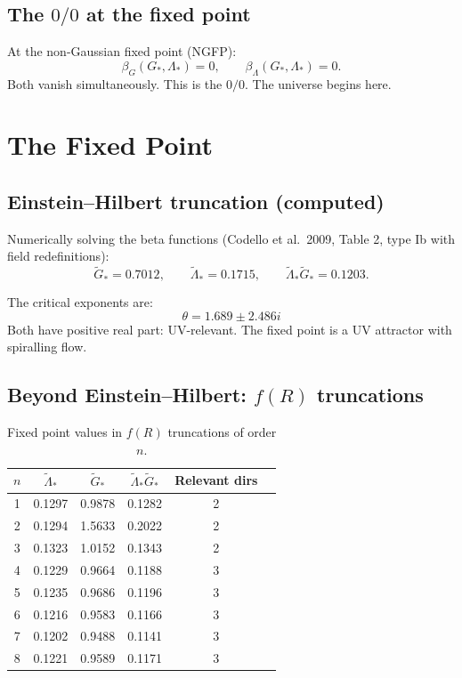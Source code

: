 \documentclass[12pt]{article}
\begin{document}
\subsection{The $0/0$ at the fixed point}

At the non-Gaussian fixed point (NGFP):
\begin{equation}
\beta_G(G_*,\Lambda_*)=0, \qquad \beta_\Lambda(G_*,\Lambda_*)=0.
\end{equation}
Both vanish simultaneously. This is the $0/0$. The universe begins here.

\section{The Fixed Point}

\subsection{Einstein--Hilbert truncation (computed)}

Numerically solving the beta functions (Codello et al.\ 2009, Table 2, type Ib with field redefinitions):
\begin{equation}
\tilde G_* = 0.7012, \qquad \tilde\Lambda_* = 0.1715, \qquad \tilde\Lambda_*\tilde G_* = 0.1203.
\end{equation}

The critical exponents are:
\begin{equation}
\theta = 1.689 \pm 2.486i
\end{equation}
Both have positive real part: UV-relevant. The fixed point is a UV attractor with spiralling flow.

\subsection{Beyond Einstein--Hilbert: $f(R)$ truncations}

\begin{table}[h]
\centering
\begin{tabular}{@{}cccccc@{}}
\toprule
$n$ & $\tilde\Lambda_*$ & $\tilde G_*$ & $\tilde\Lambda_*\tilde G_*$ & Relevant dirs \\
\midrule
1 & 0.1297 & 0.9878 & 0.1282 & 2 \\
2 & 0.1294 & 1.5633 & 0.2022 & 2 \\
3 & 0.1323 & 1.0152 & 0.1343 & 2 \\
4 & 0.1229 & 0.9664 & 0.1188 & 3 \\
5 & 0.1235 & 0.9686 & 0.1196 & 3 \\
6 & 0.1216 & 0.9583 & 0.1166 & 3 \\
7 & 0.1202 & 0.9488 & 0.1141 & 3 \\
8 & 0.1221 & 0.9589 & 0.1171 & 3 \\
\bottomrule
\end{tabular}
\caption{Fixed point values in $f(R)$ truncations of order $n$.}
\end{table}
\end{document}
